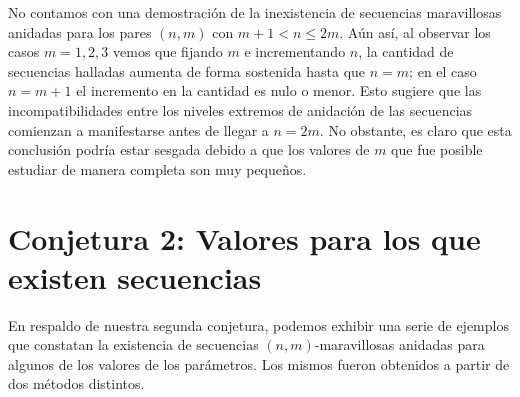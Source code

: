 No contamos con una demostración de la inexistencia de secuencias maravillosas
anidadas para los pares $(n,m)$ con $m + 1 < n \leq 2m$. Aún así,
al observar los casos $m = 1, 2, 3$ vemos que fijando $m$ e incrementando
$n$, la cantidad de secuencias halladas aumenta de forma sostenida hasta que
$n = m$; en el caso $n = m + 1$ el incremento en la cantidad es nulo o menor.
Esto sugiere que las incompatibilidades entre los niveles extremos de anidación
de las secuencias comienzan a manifestarse antes de llegar a $n = 2m$.
No obstante, es claro que esta conclusión podría estar sesgada debido a que
los valores de $m$ que fue posible estudiar de manera completa son muy pequeños.


\section{Conjetura 2: Valores para los que existen secuencias}

En respaldo de nuestra segunda conjetura, podemos exhibir una serie de ejemplos
que constatan la existencia de secuencias $(n,m)$-maravillosas anidadas para
algunos de los valores de los parámetros. Los mismos fueron obtenidos a partir
de dos métodos distintos.

